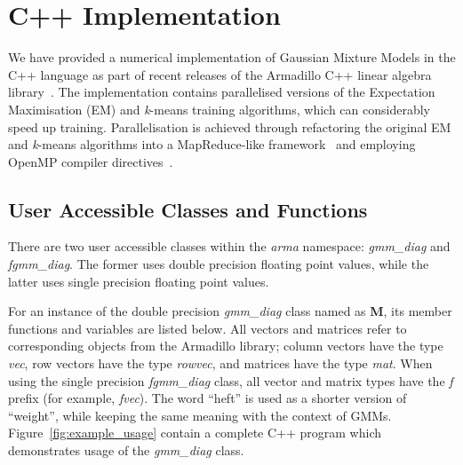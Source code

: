 \section{C++ Implementation}

We have provided a numerical implementation of Gaussian Mixture Models in the C++ language
as part of recent releases of the Armadillo C++ linear algebra library~\cite{Armadillo_JOSS_2016}.
The implementation contains parallelised versions of the Expectation Maximisation (EM) and {\it k}-means training algorithms,
which can considerably speed up training.
Parallelisation is achieved through refactoring the original EM and {\it k}-means algorithms
into a MapReduce-like framework~\cite{MapReduce_2004} and employing OpenMP compiler directives~\cite{OpenMP_2007}.

\subsection{User Accessible Classes and Functions}

There are two user accessible classes within the {\it arma} namespace:
{\it gmm\_diag} and {\it fgmm\_diag}.
The former uses double precision floating point values, while the latter uses single precision floating point values.

For an instance of the double precision {\it gmm\_diag} class named as {\bf M},
its member functions and variables are listed below.
All vectors and matrices refer to corresponding objects from the Armadillo library;
column vectors have the type {\it vec}, row vectors have the type {\it rowvec}, and matrices have the type {\it mat}.
When using the single precision {\it fgmm\_diag} class, all vector and matrix types have the {\it f} prefix (for example, {\it fvec}).
The word ``heft'' is used as a shorter version of ``weight'', while keeping the same meaning with the context of GMMs.
Figure~\ref{fig:example_usage} contain a complete C++ program which demonstrates usage of the {\it gmm\_diag} class.


